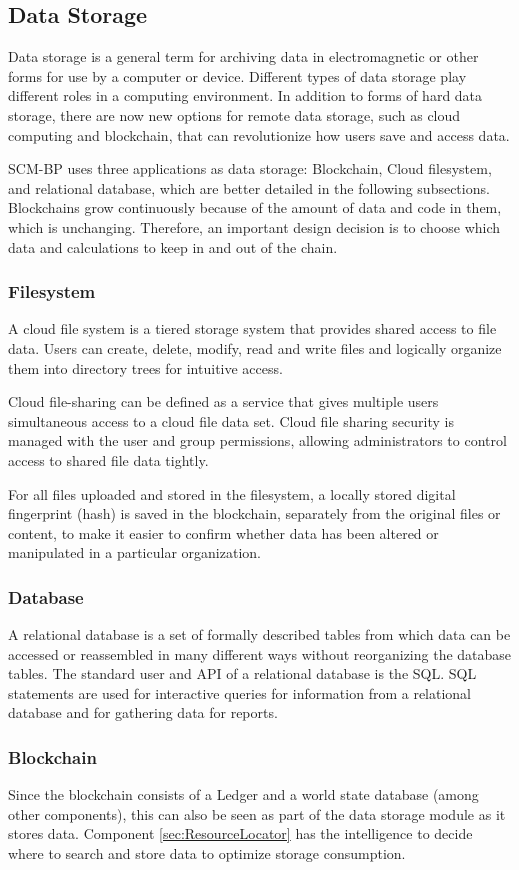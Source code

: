 \subsection{Data Storage}\label{sec:DataStorage}
Data storage is a general term for archiving data in electromagnetic or other forms for use by a computer or device. Different types of data storage play different roles in a computing environment. In addition to forms of hard data storage, there are now new options for remote data storage, such as cloud computing and blockchain, that can revolutionize how users save and access data.  

SCM-BP uses three applications as data storage: Blockchain, Cloud filesystem, and relational database, which are better detailed in the following subsections. Blockchains grow continuously because of the amount of data and code in them, which is unchanging. Therefore, an important design decision is to choose which data and calculations to keep in and out of the chain.

\subsubsection{Filesystem}\label{sec:Filesystem}
A cloud file system is a tiered storage system that provides shared access to file data. Users can create, delete, modify, read and write files and logically organize them into directory trees for intuitive access.

Cloud file-sharing can be defined as a service that gives multiple users simultaneous access to a cloud file data set. Cloud file sharing security is managed with the user and group permissions, allowing administrators to control access to shared file data tightly.

For all files uploaded and stored in the filesystem, a locally stored digital fingerprint (hash) is saved in the blockchain, separately from the original files or content, to make it easier to confirm whether data has been altered or manipulated in a particular organization.

\subsubsection{Database}\label{sec:Database}
A relational database is a set of formally described tables from which data can be accessed or reassembled in many different ways without reorganizing the database tables. The standard user and \ac{API} of a relational database is the \ac{SQL}. SQL statements are used for interactive queries for information from a relational database and for gathering data for reports.

\subsubsection{Blockchain}\label{sec:DataStorageBlockchain}

Since the blockchain consists of a Ledger and a world state database (among other components), this can also be seen as part of the data storage module as it stores data. Component \ref{sec:ResourceLocator} has the intelligence to decide where to search and store data to optimize storage consumption.
